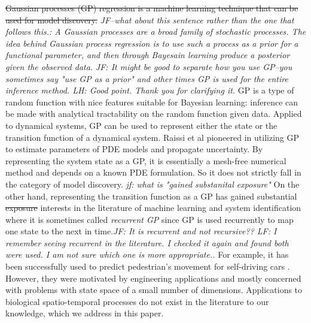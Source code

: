 \documentclass[smallextended,natbib]{svjour3}       %
\begin{document}
\sout{Gaussian processes (GP) regression is a machine learning technique that can be used for model discovery.} \emph{JF--what about this sentence rather than the one that follows this.: A Gaussian processes are a broad family of  stochastic processes.  The idea behind Gaussian process regression is to use such a process as a prior for a functional parameter, and then through Bayesain learning produce a posterior given the observed data.} \emph{JF: It might be good to separate how you use GP--you sometimes say "use GP as a prior" and other times GP is used for the entire inference method. LH: Good point. Thank you for clarifying it.} GP is a type of random function with nice features suitable for Bayesian learning: inference can be made with analytical tractability on the random function given data. Applied to dynamical systems, GP can be used to represent either the state or the transition function of a dynamical system.   Raissi et al \citep{Raissi2018,Raissi2018a} pioneered in utilizing GP to estimate parameters of PDE models and propagate uncertainty.  By representing the system state as a GP, it is essentially a mesh-free numerical method and depends on a known PDE formulation. So it does not strictly fall in the category of model discovery. \emph{jf: what is "gained substanital exposure" } On the other hand, representing the transition function as a GP has gained substantial \sout{exposure} interests in the literature of machine learning and system identification \citep{girard2003gaussian,deisenroth2009analytic} where it is sometimes called \emph{recurrent GP} since GP is used recurrently to map one state to the next in time.\emph{JF: It is recurrent and not recursive?? LF: I remember seeing recurrent in the literature. I checked it again and found both were used. I am not sure which one is more appropriate..} For example, it has been successfully used to predict pedestrian's movement for self-driving cars \citep{Wang2008}. However, they were motivated by engineering applications and mostly concerned with problems with state space of a small number of dimensions. Applications to biological spatio-temporal processes do not exist in the literature to our knowledge, which we address in this paper.
\end{document}
